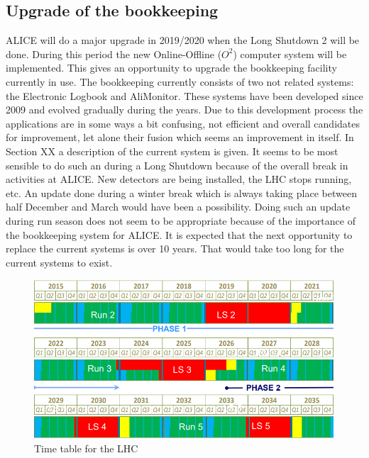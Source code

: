 \subsection{Upgrade of the bookkeeping}
ALICE will do a major upgrade in 2019/2020 when the Long Shutdown 2 will be done. During this period the new Online-Offline ($O^2$) computer system will be implemented. This gives an opportunity to upgrade the bookkeeping facility currently in use. The bookkeeping currently consists of two not related systems: the Electronic Logbook and AliMonitor. These systems have been developed since 2009 and evolved gradually during the years. Due to this development process the applications are in some ways a bit confusing, not efficient and overall candidates for improvement, let alone their fusion which seems an improvement in itself. In Section XX a description of the current system is given. It seems to be most sensible to do such an during a Long Shutdown because of the overall break in activities at ALICE. New detectors are being installed, the LHC stops running, etc. An update done during a winter break which is always taking place between half December and March would have been a possibility. Doing such an update during run season does not seem to be appropriate because of the importance of the bookkeeping system for ALICE. It is expected that the next opportunity to replace the current systems is over 10 years. That would take too long for the current systems to exist.

\begin{figure}[h]
  \begin{center}
    \includegraphics[scale=0.3]{./images/timetable.png}
    \caption{Time table for the LHC}
    \label{fig:timetable}
  \end{center}
\end{figure}

